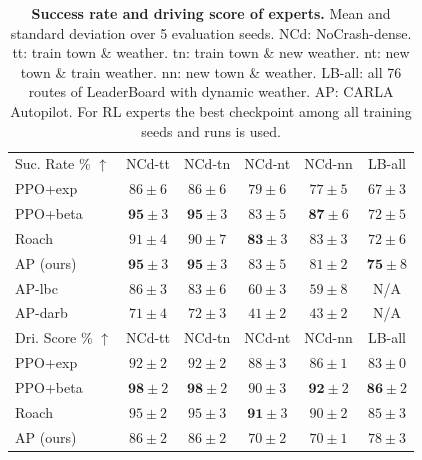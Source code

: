 \begin{table}
	\setlength{\tabcolsep}{2.32pt}
	\centering
	\begin{tabular}{lccccc}
		\toprule
		Suc. Rate \% $\uparrow$
		& NCd-tt & NCd-tn  & NCd-nt & NCd-nn & LB-all  \\ 
		\cmidrule(lr){1-1}\cmidrule(lr){2-6}
		PPO+exp & $86 \pm 6$ & $86 \pm 6$ & $79 \pm 6$ & $77 \pm 5$ & $67\pm3$  \\
		PPO+beta & $\mathbf{95} \pm 3$ & $\mathbf{95} \pm 3$ & $83 \pm 5$ & $\mathbf{87} \pm 6$ & $72 \pm 5$  \\
		Roach & $91 \pm 4$ & $90 \pm 7$ & $\mathbf{83} \pm 3$ & $83 \pm 3$ & $72 \pm 6$  \\
		\cmidrule(lr){1-1}\cmidrule(lr){2-6}
		AP (ours) & 
		$\mathbf{95} \pm 3$ & $\mathbf{95} \pm 3$ & $83 \pm 5$ & $81 \pm 2$ & $\mathbf{75} \pm 8$ \\
		AP-lbc \cite{chen2020learning}
		& $86 \pm 3$ & $83 \pm 6$ & $60 \pm 3$ & $59 \pm 8$ & N/A \\
		AP-darb \cite{prakash2020exploring}
		& $71 \pm 4$ & $72 \pm 3$ & $41 \pm 2$ & $43 \pm 2$ & N/A \\
		\toprule
		Dri. Score \% $\uparrow$
		& NCd-tt & NCd-tn  & NCd-nt & NCd-nn & LB-all  \\ 
		\cmidrule(lr){1-1}\cmidrule(lr){2-6}
		PPO+exp & $92 \pm 2$ & $92 \pm 2$ & $88 \pm 3$ & $86 \pm 1$ & $ 83\pm0$  \\
		PPO+beta & $\mathbf{98} \pm 2$ & $\mathbf{98} \pm 2$ & $90 \pm 3$ & $\mathbf{92} \pm 2$ & $\mathbf{86} \pm 2$  \\
		Roach & $95 \pm 2$ & $95 \pm 3$ & $\mathbf{91} \pm 3$ & $90 \pm 2$ & $85 \pm 3$  \\
		\cmidrule(lr){1-1}\cmidrule(lr){2-6}
		AP (ours)
		& $86 \pm 2$ & $86 \pm 2$ & $70 \pm 2$ & $70 \pm 1$
		& $78 \pm 3$ \\
		\bottomrule
	\end{tabular}
	\vspace{-1ex}
	\caption{\textbf{Success rate and driving score of experts.} 
	Mean and standard deviation over 5 evaluation seeds. 
	NCd: NoCrash-dense. 
	tt: train town \& weather. 
	tn: train town \& new weather. 
	nt: new town \& train weather. 
	nn: new town \& weather. 
	LB-all: all 76 routes of LeaderBoard with dynamic weather. 
	AP: CARLA Autopilot. 
	For RL experts the best checkpoint among all training seeds and runs is used.}
	\label{table:expert_performance}
	\vspace{-2ex}
\end{table}



